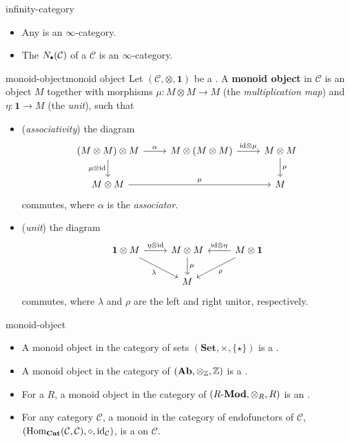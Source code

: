 \begin{example}{infinity-category}
    \begin{itemize}
        \item Any  is an $\infty$-category.
        \item The  $N_\bdot(\mathcal{C})$ of a  $\mathcal{C}$ is an $\infty$-category.
    \end{itemize}
\end{example}

\begin{topic}{monoid-object}{monoid object}
    Let $(\mathcal{C}, \otimes, \textbf{1})$ be a . A \textbf{monoid object} in $\mathcal{C}$ is an object $M$ together with morphisms $\mu : M \otimes M \to M$ (the \textit{multiplication map}) and $\eta : \textbf{1} \to M$ (the \textit{unit}), such that
    \begin{itemize}
        \item (\textit{associativity}) the diagram
        \[ \begin{tikzcd} (M \otimes M) \otimes M \arrow[swap]{d}{\mu \otimes \id} \arrow{r}{\alpha} & M \otimes (M \otimes M) \arrow{r}{\id \otimes \mu} & M \otimes M \arrow{d}{\mu} \\ M \otimes M \arrow{rr}{\mu} && M \end{tikzcd} \]
        commutes, where $\alpha$ is the \textit{associator}.
        \item (\textit{unit}) the diagram
        \[ \begin{tikzcd} \textbf{1} \otimes M \arrow{r}{\eta \otimes \id} \arrow[swap]{rd}{\lambda} & M \otimes M \arrow{d}{\mu} & M \otimes \textbf{1} \arrow[swap]{l}{\id \otimes \eta} \arrow{dl}{\rho} \\ & M & \end{tikzcd} \]
        commutes, where $\lambda$ and $\rho$ are the left and right unitor, respectively.
    \end{itemize}
\end{topic}

\begin{example}{monoid-object}
    \begin{itemize}
        \item A monoid object in the category of sets $(\textbf{Set}, \times, \{ \star \})$ is a .
        \item A monoid object in the category of  $(\textbf{Ab}, \otimes_{\mathbb{Z}}, \mathbb{Z})$ is a .
        \item For a  $R$, a monoid object in the category of  $(R\textup{-}\textbf{Mod}, \otimes_R, R)$ is an .
        \item For any category $\mathcal{C}$, a monoid in the category of endofunctors of $\mathcal{C}$, $(\text{Hom}_\textbf{Cat}(\mathcal{C}, \mathcal{C}), \circ, \text{id}_\mathcal{C})$, is a  on $\mathcal{C}$.
    \end{itemize}
\end{example}

